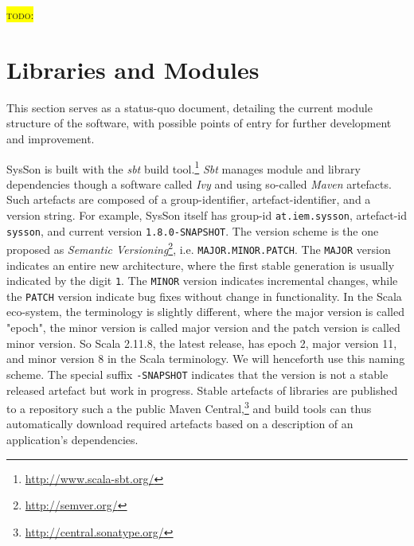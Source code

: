 \documentclass[11pt,a4paper]{article}
\newcommand{\todo}[1]{\colorbox{yellow}{\textsc{todo}: #1}}
\newcommand{\software}[1]{\textit{#1}}
\newcommand{\sysson}[0]{SysSon}
\begin{document}
\todo{}

\section{Libraries and Modules}

This section serves as a status-quo document, detailing the current module structure of the software, with possible points of entry for further development and improvement.

\sysson{} is built with the \software{sbt} build tool.\footnote{\url{http://www.scala-sbt.org/}} \software{Sbt} manages module and library dependencies though a software called \software{Ivy} and using so-called \software{Maven} artefacts. Such artefacts are composed of a group-identifier, artefact-identifier, and a version string. For example, \sysson{} itself has group-id \verb!at.iem.sysson!, artefact-id \verb!sysson!, and current version \verb!1.8.0-SNAPSHOT!. The version scheme is the one proposed as \emph{Semantic Versioning}\footnote{\url{http://semver.org/}}, i.e. \verb!MAJOR.MINOR.PATCH!. The \verb!MAJOR! version indicates an entire new architecture, where the first stable generation is usually indicated by the digit \verb!1!. The \verb!MINOR! version indicates incremental changes, while the \verb!PATCH! version indicate bug fixes without change in functionality. In the Scala eco-system, the terminology is slightly different, where the major version is called "epoch", the minor version is called major version and the patch version is called minor version. So Scala 2.11.8, the latest release, has epoch 2, major version 11, and minor version 8 in the Scala terminology. We will henceforth use this naming scheme. The special suffix \verb!-SNAPSHOT! indicates that the version is not a stable released artefact but work in progress. Stable artefacts of libraries are published to a repository such a the public Maven Central,\footnote{\url{http://central.sonatype.org/}} and build tools can thus automatically download required artefacts based on a description of an application's dependencies.
\end{document}
